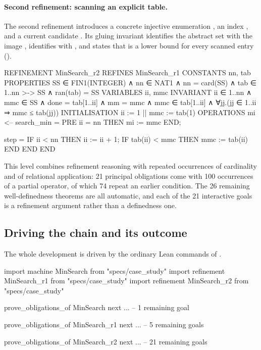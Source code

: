 \paragraph*{Second refinement: scanning an explicit table.}
The second refinement introduces a concrete injective enumeration
, an index , and a current candidate .
Its gluing invariant identifies the abstract set  with the image
, identifies  with , and states that  is a
lower bound for every scanned entry ().

\begin{blisting}[title={The second refinement \texttt{MinSearch\_r2}.},
    label={lst:barrel-minsearch-r2}, float=t]
REFINEMENT MinSearch_r2
REFINES MinSearch_r1
CONSTANTS  nn, tab
PROPERTIES
  SS ∈ FIN1(INTEGER) ∧ nn ∈ NAT1 ∧ nn = card(SS) ∧
  tab ∈ 1..nn >-> SS ∧ ran(tab) = SS
VARIABLES  ii, mmc
INVARIANT
  ii ∈ 1..nn ∧ mmc ∈ SS ∧ done = tab[1..ii] ∧ mm = mmc ∧
  mmc ∈ tab[1..ii] ∧ ∀jj.(jj ∈ 1..ii ⇒ mmc ≤ tab(jj))
INITIALISATION
  ii := 1 || mmc := tab(1)
OPERATIONS
  mi <-- search_min = PRE ii = nn THEN mi := mmc END;

  step =
    IF ii < nn THEN
      ii := ii + 1;
      IF tab(ii) < mmc THEN mmc := tab(ii) END
    END
END
\end{blisting}

This level combines refinement reasoning with repeated occurrences of cardinality and of
relational application: 21 principal obligations come with 100 occurrences of a partial
operator, of which 74 repeat an earlier condition.
The 26 remaining well-definedness theorems are all automatic, and each of the 21 interactive
goals is a refinement argument rather than a definedness one.

\subsection{Driving the chain and its outcome}
\label{subsec:barrel-minsearch-results}

The whole development is driven by the ordinary Lean commands of
.

\begin{leanlisting}[title={Driving the refinement chain with \barrel{}.},
    label={lst:barrel-minsearch-lean}, float=t]
import machine    MinSearch    from "specs/case_study"
import refinement MinSearch_r1 from "specs/case_study"
import refinement MinSearch_r2 from "specs/case_study"

prove_obligations_of MinSearch
next ...  --  1 remaining goal

prove_obligations_of MinSearch_r1
next ...  --  5 remaining goals

prove_obligations_of MinSearch_r2
next ...  -- 21 remaining goals
\end{leanlisting}

